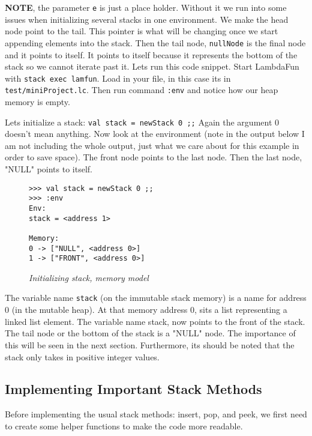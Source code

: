\documentclass{article}
\begin{document}
\medskip\noindent
\textbf{NOTE}, the parameter \texttt{e} is just a place holder. Without it we run into some issues when initializing several stacks in one environment. We make the head node point to the tail. This pointer is what will be changing once we start appending elements into the stack. Then the tail node, \texttt{nullNode} is the final node and it points to itself. It points to itself because it represents the bottom of the stack so we cannot iterate past it. Lets run this code snippet. Start LambdaFun with \texttt{stack exec lamfun}. Load in your file, in this case its in \texttt{test/miniProject.lc}. Then run command \texttt{:env} and notice how our heap memory is empty. 

\medskip\noindent
Lets initialize a stack: \texttt{val stack = newStack 0 ;;} Again the argument 0 doesn't mean anything. Now look at the environment (note in the output below I am not including the whole output, just what we care about for this example in order to save space). The front node points to the last node. Then the last node, "NULL" points to itself. 

\begin{figure}[H]
    \begin{lstlisting}
>>> val stack = newStack 0 ;;
>>> :env
Env:
stack = <address 1>

Memory:
0 -> ["NULL", <address 0>]
1 -> ["FRONT", <address 0>]
    \end{lstlisting}
    \caption{\textit{Initializing stack, memory model}}
\end{figure}

\noindent
The variable name \texttt{stack} (on the immutable stack memory) is a name for address 0 (in the mutable heap). At that memory address 0, sits a list representing a linked list element. The variable name stack, now points to the front of the stack. The tail node or the bottom of the stack is a "NULL" node. The importance of this will be seen in the next section. Furthermore, its should be noted that the stack only takes in positive integer values.

\subsection{Implementing Important Stack Methods}

\medskip\noindent
Before implementing the usual stack methods: insert, pop, and peek, we first need to create some helper functions to make the code more readable. 
\end{document}
